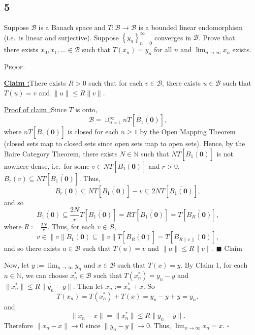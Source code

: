 \documentclass[12pt]{article}
\newcounter{ProofCounter}
\newcounter{ClaimCounter}[ProofCounter]
\newenvironment{Proof}{\stepcounter{ProofCounter}\textsc{Proof.}}{\hfill$\square$}
\newenvironment{claim}[1]{\vspace{1mm}\stepcounter{ClaimCounter}\par\noindent\underline{\bf Claim \theClaimCounter:}\space#1}{}
\newenvironment{claimproof}[1]{\par\noindent\underline{Proof of claim \theClaimCounter:}\space#1}{\hfill $\blacksquare$ Claim \theClaimCounter}
\begin{document}
\subsection*{5}
\begin{tcolorbox}
  Suppose $\mathcal{B}$ is a Banach space and $T : \mathcal{B} \rightarrow \mathcal{B}$ is a bounded linear endomorphism (i.e.\ is linear %
  and surjective). Suppose $\left\{ y_n \right\}_{n=0}^{\infty}$ converges in $\mathcal{B}$. Prove that there exists $x_0, x_1, \hdots \in \mathcal{B}$
  such that $T(x_n) = y_n$ for all $n$ and $\lim_{n\rightarrow\infty}x_n$ exists.
\end{tcolorbox}
\begin{Proof}
  \begin{claim}
    There exists $R > 0$ such that for each $v \in \mathcal{B}$, there exists $u \in \mathcal{B}$ such that $T(u) = v$ and $\|u\| \leq R\|v\|$.
  \end{claim}
  \begin{claimproof}
    Since $T$ is onto, 
    \[ \mathcal{B} = \cup_{n=1}^{\infty}nT[\overline{B_1(\bm{0})}], \]
    where $nT[\overline{B_1(\bm{0})}]$ is closed for each $n \geq 1$ by the Open Mapping Theorem (closed sets map to closed sets since open sets map
    to open sets).
    Hence, by the Baire Category Theorem, there exists $N \in \mathbb{N}$ such that $NT[\overline{B_1(\bm{0})}]$ is not nowhere dense, i.e.\ for some 
    $v\in NT[\overline{B_1(\bm{0})}]$ and $r > 0$, $B_r(v) \subseteq NT[\overline{B_1(\bm{0})}]$. Thus,
    \[ B_r(\bm{0}) \subseteq NT[\overline{B_1(\bm{0})}] - v \subseteq 2NT[\overline{B_1(\bm{0})}], \]
    and so
    \[ \overline{B_1(\bm{0})} \subseteq \frac{2N}{r}T[\overline{B_1(\bm{0})}] = RT[\overline{B_{1}(\bm{0})}] = T[\overline{B_{R}(\bm{0})}], \]
    where $R := \frac{2N}{r}$. Thus, for each $v \in \mathcal{B}$, 
    \[ v \in \|v\|\overline{B_1(\bm{0})} \subseteq \|v\|T[\overline{B_{R}(\bm{0})}] = T[\overline{B_{R\|v\|}(\bm{0})}], \]
    and so there exists $u \in \mathcal{B}$ such that $T(u) = v$ and $\|u\| \leq R\|v\|$.
  \end{claimproof}

  \vspace{5mm}
  Now, let $y := \lim_{n\rightarrow\infty}y_{n}$ and $x \in \mathcal{B}$ such that $T(x) = y$. 
  By Claim 1, for each $n \in \mathbb{N}$, we can choose $x_{n}^{*} \in \mathcal{B}$ such that 
  $T(x_{n}^{*}) = y_n - y$ and $\|x_{n}^{*}\| \leq R\|y_n - y\|$. Then let $x_n := x_{n}^{*} + x$. So
  \[ T(x_n) = T(x_{n}^{*}) + T(x) = y_n - y + y = y_n, \]
  and 
  \[ \|x_n - x\| = \|x_{n}^{*}\| \leq R \|y_n - y\|. \]
  Therefore $\|x_n - x\| \rightarrow 0$ since $\|y_n - y\| \rightarrow 0$. Thus, $\lim_{n\rightarrow\infty}x_n = x$.
\end{Proof}
\end{document}
